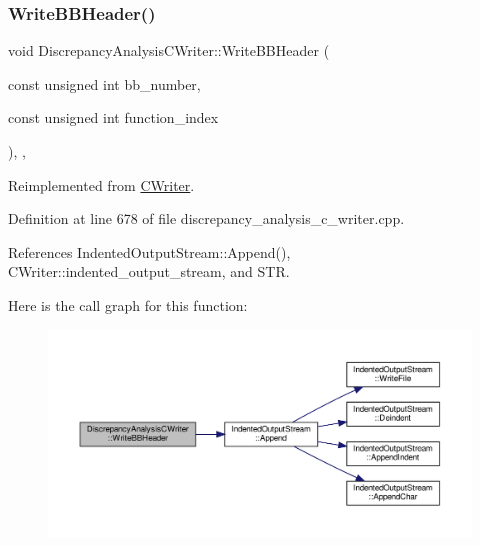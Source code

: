 \subsubsection{\texorpdfstring{Write\+B\+B\+Header()}{WriteBBHeader()}}
{\footnotesize\ttfamily void Discrepancy\+Analysis\+C\+Writer\+::\+Write\+B\+B\+Header (\begin{DoxyParamCaption}\item[{const unsigned int}]{bb\+\_\+number,  }\item[{const unsigned int}]{function\+\_\+index }\end{DoxyParamCaption})\hspace{0.3cm}{\ttfamily [override]}, {\ttfamily [protected]}, {\ttfamily [virtual]}}



Reimplemented from \hyperlink{classCWriter_a60ced6c07b4f41a09acdae409615e24e}{C\+Writer}.



Definition at line 678 of file discrepancy\+\_\+analysis\+\_\+c\+\_\+writer.\+cpp.



References Indented\+Output\+Stream\+::\+Append(), C\+Writer\+::indented\+\_\+output\+\_\+stream, and S\+TR.

Here is the call graph for this function\+:
\nopagebreak
\begin{figure}[H]
\begin{center}
\leavevmode
\includegraphics[width=350pt]{d4/d5c/classDiscrepancyAnalysisCWriter_aa06e1b8c2dedbdb1278f61c7970ebc62_cgraph}
\end{center}
\end{figure}
\mbox{\label{classDiscrepancyAnalysisCWriter_a614b57f4cd76435c0b7266ac677145d5}} 
